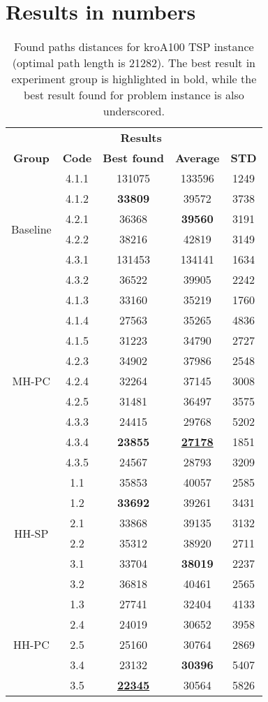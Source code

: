 \section{Results in numbers}
\begin{table}[!htbp]
	\begin{tabular}{cc|ccc}
		\hline
		\rowcolor{gray!20}
		\multicolumn{2}{c|}{\textbf{Solver}} & \multicolumn{3}{c}{\textbf{Results}} \\
		\rowcolor{gray!20}
		\textbf{Group} & \textbf{Code} & \textbf{Best found} & \textbf{Average} & \textbf{STD} \\
		\hline
		\multirow{6}{*}{Baseline} 
		& 4.1.1 & 131075 & 133596 & 1249 \\
		& 4.1.2 & \textbf{33809} & 39572 & 3738 \\
		& 4.2.1 & 36368 & \textbf{39560} & 3191 \\
		& 4.2.2 & 38216 & 42819 & 3149 \\
		& 4.3.1 & 131453 & 134141 & 1634 \\
		& 4.3.2 & 36522 & 39905 & 2242 \\
		\hline
		\multirow{9}{*}{MH-PC} 
		& 4.1.3 & 33160 & 35219 & 1760 \\
		& 4.1.4 & 27563 & 35265 & 4836 \\
		& 4.1.5 & 31223 & 34790 & 2727 \\
		& 4.2.3 & 34902 & 37986 & 2548 \\
		& 4.2.4 & 32264 & 37145 & 3008 \\
		& 4.2.5 & 31481 & 36497 & 3575 \\
		& 4.3.3 & 24415 & 29768 & 5202 \\
		& 4.3.4 & \textbf{23855} & \textbf{\underline{27178}} & 1851 \\
		& 4.3.5 & 24567 & 28793 & 3209 \\
		\hline
		\multirow{6}{*}{HH-SP} 
		& 1.1 & 35853 & 40057 & 2585 \\
		& 1.2 & \textbf{33692} & 39261 & 3431 \\
		& 2.1 & 33868 & 39135 & 3132 \\
		& 2.2 & 35312 & 38920 & 2711 \\
		& 3.1 & 33704 & \textbf{38019} & 2237 \\
		& 3.2 & 36818 & 40461 & 2565 \\
		\hline
		\multirow{5}{*}{HH-PC} 
		& 1.3 & 27741 & 32404 & 4133 \\
		& 2.4 & 24019 & 30652 & 3958 \\
		& 2.5 & 25160 & 30764 & 2869 \\
		& 3.4 & 23132 & \textbf{30396} & 5407 \\
		& 3.5 & \textbf{\underline{22345}} & 30564 & 5826 \\
		\hline
	\end{tabular}
	\caption{Found paths distances for kroA100 TSP instance (optimal path length is 21282). The best result in experiment group is highlighted in bold, while the best result found for problem instance is also underscored.}
\end{table}

